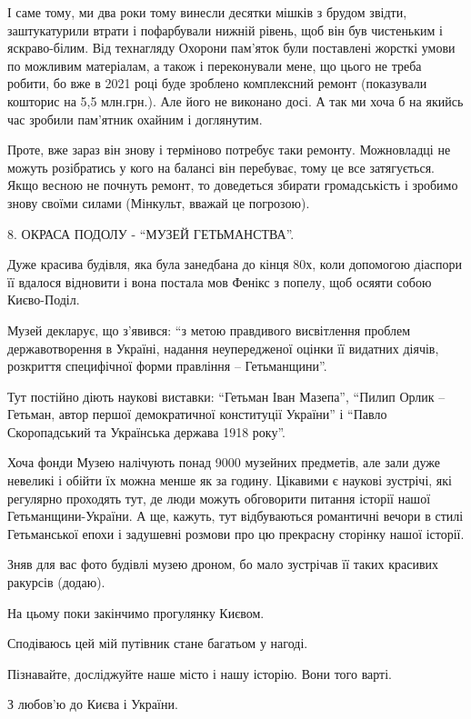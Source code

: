 І саме тому, ми два роки тому винесли десятки мішків з брудом звідти,
заштукатурили втрати і пофарбували нижній рівень, щоб він був чистеньким і
яскраво-білим. Від технагляду Охорони пам'яток були поставлені жорсткі умови по
можливим матеріалам, а також і переконували мене, що цього не треба робити, бо
вже в 2021 році буде зроблено комплексний ремонт (показували кошторис на 5,5
млн.грн.). Але його не виконано досі. А так ми хоча б на якийсь час зробили
пам'ятник охайним і доглянутим. 

Проте, вже зараз він знову і терміново потребує таки ремонту. Можновладці не
можуть розібратись у кого на балансі він перебуває, тому це все затягується.
Якщо весною не почнуть ремонт, то доведеться збирати громадськість і зробимо
знову своїми силами (Мінкульт, вважай це погрозою). 


8. ОКРАСА ПОДОЛУ - \enquote{МУЗЕЙ ГЕТЬМАНСТВА}. 

Дуже красива будівля, яка була занедбана до кінця 80х, коли допомогою діаспори
її вдалося відновити і вона постала мов Фенікс з попелу, щоб осяяти собою
Києво-Поділ.

Музей декларує, що з’явився: \enquote{з метою правдивого висвітлення проблем
державотворення в Україні, надання неупередженої оцінки її видатних діячів,
розкриття специфічної форми правління – Гетьманщини}.

Тут постійно діють наукові виставки: \enquote{Гетьман Іван Мазепа},
\enquote{Пилип Орлик – Гетьман, автор першої демократичної конституції України}
і \enquote{Павло Скоропадський та Українська держава 1918 року}. 

Хоча фонди Музею налічують понад 9000 музейних предметів, але зали дуже
невеликі і обійти їх можна менше як за годину. Цікавими є наукові зустрічі, які
регулярно проходять тут, де люди можуть обговорити питання історії нашої
Гетьманщини-України. А ще, кажуть, тут відбуваються романтичні вечори в стилі
Гетьманської епохи і задушевні розмови про цю прекрасну сторінку нашої історії.

Зняв для вас фото будівлі музею дроном, бо мало зустрічав її таких красивих
ракурсів (додаю). 

На цьому поки закінчимо прогулянку Києвом.

Сподіваюсь цей мій путівник стане багатьом у нагоді.

Пізнавайте, досліджуйте наше місто і нашу історію. Вони того варті.

З любов'ю до Києва і України.
